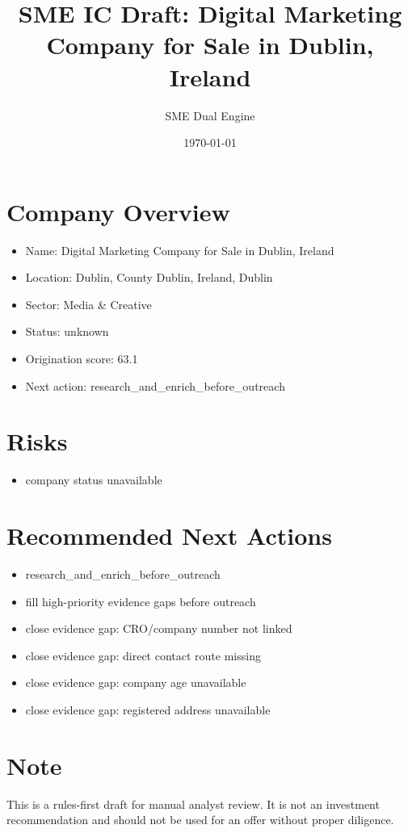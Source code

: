 \documentclass[11pt,a4paper]{article}
\title{SME IC Draft: Digital Marketing Company for Sale in Dublin, Ireland}
\author{SME Dual Engine}
\date{\today}
\begin{document}
\maketitle
\section*{Company Overview}
\begin{itemize}[leftmargin=1.4em]
\item Name: Digital Marketing Company for Sale in Dublin, Ireland
\item Location: Dublin, County Dublin, Ireland, Dublin
\item Sector: Media \& Creative
\item Status: unknown
\item Origination score: 63.1
\item Next action: research\_and\_enrich\_before\_outreach
\end{itemize}
\section*{Risks}
\begin{itemize}[leftmargin=1.4em]
\item company status unavailable
\end{itemize}
\section*{Recommended Next Actions}
\begin{itemize}[leftmargin=1.4em]
\item research\_and\_enrich\_before\_outreach
\item fill high-priority evidence gaps before outreach
\item close evidence gap: CRO/company number not linked
\item close evidence gap: direct contact route missing
\item close evidence gap: company age unavailable
\item close evidence gap: registered address unavailable
\end{itemize}
\section*{Note}
This is a rules-first draft for manual analyst review. It is not an investment
recommendation and should not be used for an offer without proper diligence.
\end{document}
